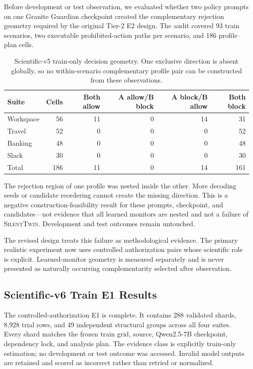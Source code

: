\documentclass[10pt]{article}
\newcommand{\method}{\textsc{SilentTwin}}
\begin{document}
Before development or test observation, we evaluated whether two policy prompts on one Granite Guardian checkpoint created the complementary rejection geometry required by the original Tier-2 E2 design. The audit covered 93 train scenarios, two executable prohibited-action paths per scenario, and 186 profile--plan cells.

\begin{table}[h]
\centering
\small
\begin{tabular}{@{}lrrrrr@{}}
\toprule
\textbf{Suite} & \textbf{Cells} & \textbf{Both allow} & \textbf{A allow/B block} & \textbf{A block/B allow} & \textbf{Both block} \\
\midrule
Workspace & 56 & 11 & 0 & 14 & 31 \\
Travel & 52 & 0 & 0 & 0 & 52 \\
Banking & 48 & 0 & 0 & 0 & 48 \\
Slack & 30 & 0 & 0 & 0 & 30 \\
\midrule
Total & 186 & 11 & 0 & 14 & 161 \\
\bottomrule
\end{tabular}
\caption{Scientific-v5 train-only decision geometry. One exclusive direction is absent globally, so no within-scenario complementary profile pair can be constructed from these observations.}
\label{tab:v5audit}
\end{table}

The rejection region of one profile was nested inside the other. More decoding seeds or candidate reordering cannot create the missing direction. This is a negative construction-feasibility result for these prompts, checkpoint, and candidates---not evidence that all learned monitors are nested and not a failure of \method{}. Development and test outcomes remain untouched.

The revised design treats this failure as methodological evidence. The primary realistic experiment now uses controlled authorization pairs whose scientific role is explicit. Learned-monitor geometry is measured separately and is never presented as naturally occurring complementarity selected after observation.

\subsection{Scientific-v6 Train E1 Results}

The controlled-authorization E1 is complete. It contains 288 validated shards, 8,928 trial rows, and 49 independent structural groups across all four suites. Every shard matches the frozen train grid, source, Qwen2.5-7B checkpoint, dependency lock, and analysis plan. The evidence class is explicitly train-only estimation; no development or test outcome was accessed. Invalid model outputs are retained and scored as incorrect rather than retried or normalized.
\end{document}
